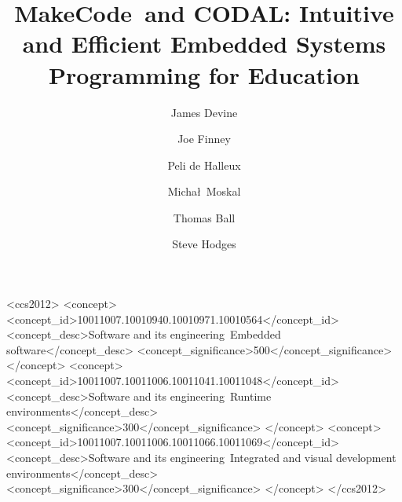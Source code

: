 \documentclass[sigplan, screen]{acmart}
\newcommand{\MC}{MakeCode\ }
\newcommand{\CON}{CODAL}
\begin{document}
\title[\MC and \CON: Intuitive and Efficient Embedded...]{\MC and \CON: Intuitive and Efficient Embedded Systems Programming for Education}         %

\acmPrice{}

\author{James Devine}

\author{Joe Finney}

\author{Peli de Halleux}

\author{Micha\l\ Moskal}

\author{Thomas Ball}

\author{Steve Hodges}



\begin{CCSXML}
  <ccs2012>
  <concept>
  <concept_id>10011007.10010940.10010971.10010564</concept_id>
  <concept_desc>Software and its engineering~Embedded software</concept_desc>
  <concept_significance>500</concept_significance>
  </concept>
  <concept>
  <concept_id>10011007.10011006.10011041.10011048</concept_id>
  <concept_desc>Software and its engineering~Runtime environments</concept_desc>
  <concept_significance>300</concept_significance>
  </concept>
  <concept>
  <concept_id>10011007.10011006.10011066.10011069</concept_id>
  <concept_desc>Software and its engineering~Integrated and visual development environments</concept_desc>
  <concept_significance>300</concept_significance>
  </concept>
  </ccs2012>
\end{CCSXML}
\end{document}
